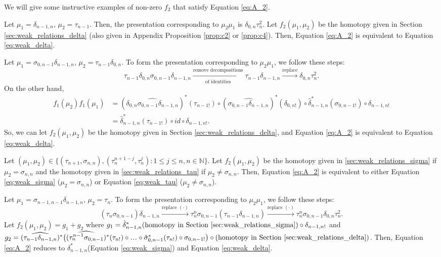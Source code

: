We will give some instructive examples 
of non-zero $f_2$ that satisfy Equation 
\ref{eq:A_2}.
\begin{eg}
Let $\mu_1 = \delta_{n-1,n}$, $\mu_2 = 
\tau_{n-1}$. Then, the presentation 
corresponding to $\mu_2\mu_1$ is 
$\delta_{0,n}\tau_n^2$. Let 
$f_2(\mu_1, \mu_2)$ be the homotopy given 
in Section \ref{sec:weak_relations_delta} 
(also given in Appendix Proposition 
\ref{prop:c2} or \ref{prop:c4}). 
Then, Equation \ref{eq:A_2} 
is equivalent to Equation \ref{eq:weak_delta}.
\end{eg}
%
\begin{eg}
Let $\mu_1 = \sigma_{0,n-1} \delta_{n-1,n}$, 
$\mu_2 = \tau_{n-1} \delta_{0,n}$. To 
form the presentation corresponding to 
$\mu_2\mu_1$, we follow these steps: 
$$
\tau_{n-1} \delta_{0,n} \sigma_{0,n-1} 
\delta_{n-1,n} 
\xrightarrow[\textrm{of identities}]{\textrm{remove decompositions}}
\tau_{n-1} \delta_{n-1,n}
\xrightarrow{\textrm{replace}}
\delta_{0,n}\tau_n^2.
$$
On the other hand, 
\begin{align*}
f_1(\mu_2)f_1(\mu_1) 
&= 
(\widehat{\delta_{0,n}\sigma_{0,n-1}
  \delta_{n-1,n}})^*(\tau_{n-1!}) \circ
  (\widehat{\sigma_{0,n-1}\delta_{n-1,n}})^*
  (\delta_{0,n!}) \circ 
  \hat{\delta}_{n-1,n}^*(\sigma_{0,n-1!}) 
  \circ \delta_{n-1,n!}\\
&= 
\hat{\delta}_{n-1,n}^*(\tau_{n-1!}) \circ
  id \circ \delta_{n-1,n!}.
\end{align*}
So, we can let $f_2(\mu_1, \mu_2)$ be the 
homotopy given in Section 
\ref{sec:weak_relations_delta}, and Equation 
\ref{eq:A_2} is equivalent to Equation 
\ref{eq:weak_delta}.
\end{eg}
%
\begin{eg}
Let $(\mu_1, \mu_2) \in \{ (\tau_{n+1}, 
\sigma_{n,n}), (\tau_{n}^{n+1-j}, 
\tau_n^j): 1\leq j \leq n, n \in \mathbb{N}
\}$. Let $f_2(\mu_1, \mu_2)$ be 
the homotopy given in 
\ref{sec:weak_relations_sigma} if $\mu_2 = 
\sigma_{n,n}$ and the homotopy given in 
\ref{sec:weak_relations_tau} if $\mu_2 \neq 
\sigma_{n,n}$. Then, Equation \ref{eq:A_2} 
is equivalent to either Equation 
\ref{eq:weak_sigma} ($\mu_2 = 
\sigma_{n,n}$) or Equation \ref{eq:weak_tau} 
($\mu_2 \neq \sigma_{n,n}$).
\end{eg}
%
\begin{eg}
Let $\mu_1 = \sigma_{n-1,n-1} \delta_{n-1,n}$, 
$\mu_2 = \tau_n$. To 
form the presentation corresponding to 
$\mu_2\mu_1$, we follow these steps: 
$$
(\tau_n \sigma_{0,n-1}) 
\delta_{n-1,n} 
\xrightarrow{\textrm{replace $(\cdot)$}}
\tau_n^n \sigma_{0,n-1}(\tau_{n-1}\delta_{n-1,n})
\xrightarrow{\textrm{replace $(\cdot)$}}
\tau_n^n \sigma_{0,n-1}\delta_{0,n}\tau_n^2.
$$
Let $f_2(\mu_1, \mu_2) = g_1 + g_2$ where 
$g_1 = \hat{\delta}_{n-1,n}^*( 
\textrm{homotopy in Section 
\ref{sec:weak_relations_sigma}})\circ
\delta_{n-1,n!}$ and $g_2 = 
(\widehat{\tau_{n-1}\delta_{n-1,n}})^*\big(
(\widehat{\tau_n^{n-1}\sigma_{0,n-1}})^*
  (\tau_{n!}) \circ \smdots \circ 
  \hat{\sigma}_{0,n-1}^*(\tau_{n!}) \circ 
  \sigma_{0,n-1!} \big) \circ 
\textrm{(homotopy in Section 
\ref{sec:weak_relations_delta})}$. 
Then, Equation \ref{eq:A_2} 
reduces to $\delta_{n-1,n}^*$(Equation 
\ref{eq:weak_sigma}) and Equation 
\ref{eq:weak_delta}.
\end{eg}
